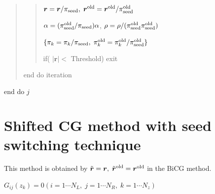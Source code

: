 \documentclass[letterpaper,10pt,dvipdfmx,openany]{sphinxmanual}
\begin{document}
\begin{quote}
\begin{quote}
\({\boldsymbol r} = {\boldsymbol r} / \pi_{\rm seed},\; {\boldsymbol r}^{\rm old} = {\boldsymbol r}^{\rm old} / \pi_{\rm seed}^{\rm old}\)

\(\alpha = (\pi_{\rm seed}^{\rm old} / \pi_{\rm seed}) \alpha\), \(\rho = \rho / (\pi_{\rm seed}^{\rm old} \pi_{\rm seed}^{\rm old})\)

\(\{\pi_k = \pi_k/\pi_{\rm seed},\; \pi_k^{\rm old} = \pi_k^{\rm old} / \pi_{\rm seed}^{\rm old}\}\)

if( \(|{\boldsymbol r}| <\) Threshold) exit
\end{quote}

end do iteration
\end{quote}

end do \(j\)


\section{Shifted CG method with seed switching technique}
\label{komega_algorithm_en:shifted-cg-method-with-seed-switching-technique}
This method is obtained by
\({\tilde {\boldsymbol r}} = {\boldsymbol r},\; {\tilde {\boldsymbol r}}^{\rm old} = {\boldsymbol r}^{\rm old}\)
in the BiCG method.

\(G_{i j}(z_k) = 0 (i=1 \cdots N_L,\; j = 1 \cdots N_R,\; k=1 \cdots N_z)\)
\end{document}
